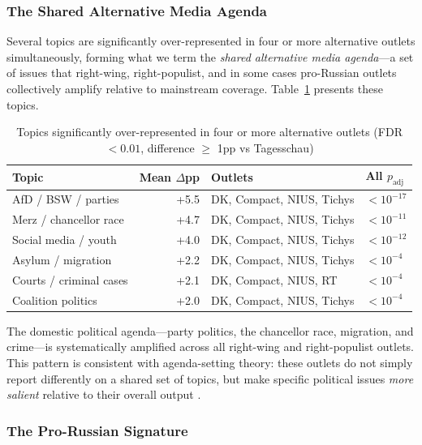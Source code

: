 \subsubsection{The Shared Alternative Media Agenda}

Several topics are significantly over-represented in four or more alternative outlets simultaneously, forming what we term the \textit{shared alternative media agenda}---a set of issues that right-wing, right-populist, and in some cases pro-Russian outlets collectively amplify relative to mainstream coverage. Table~\ref{tab:shared_agenda} presents these topics.

\begin{table}[H]
\centering
\caption{Topics significantly over-represented in four or more alternative outlets (FDR $< 0.01$, difference $\geq$ 1pp vs Tagesschau)}
\label{tab:shared_agenda}
\begin{tabular}{lrll}
\hline
\textbf{Topic} & \textbf{Mean $\Delta$pp} & \textbf{Outlets} & \textbf{All $p_{\text{adj}}$} \\
\hline
AfD / BSW / parties            & +5.5 & DK, Compact, NIUS, Tichys   & $< 10^{-17}$ \\
Merz / chancellor race         & +4.7 & DK, Compact, NIUS, Tichys   & $< 10^{-11}$ \\
Social media / youth           & +4.0 & DK, Compact, NIUS, Tichys   & $< 10^{-12}$ \\
Asylum / migration             & +2.2 & DK, Compact, NIUS, Tichys   & $< 10^{-4}$  \\
Courts / criminal cases        & +2.1 & DK, Compact, NIUS, RT       & $< 10^{-4}$  \\
Coalition politics             & +2.0 & DK, Compact, NIUS, Tichys   & $< 10^{-4}$  \\
\hline
\end{tabular}
\end{table}

The domestic political agenda---party politics, the chancellor race, migration, and crime---is systematically amplified across all right-wing and right-populist outlets. This pattern is consistent with agenda-setting theory: these outlets do not simply report differently on a shared set of topics, but make specific political issues \textit{more salient} relative to their overall output \parencite{mccombs1972agenda}.

\subsubsection{The Pro-Russian Signature}

